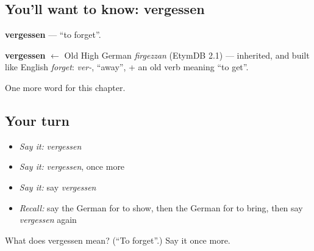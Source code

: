 \subsection*{You'll want to know: vergessen}
\textbf{vergessen} — \textquotedblleft{}to forget\textquotedblright{}.

\begin{cousinweb}
\textbf{vergessen} $\leftarrow$ Old High German \emph{firgezzan} (EtymDB 2.1) — inherited, and built like English \emph{forget}: \emph{ver-}, \textquotedblleft{}away\textquotedblright{}, + an old verb meaning \textquotedblleft{}to get\textquotedblright{}.
\end{cousinweb}

\begin{grammarlens}[title={What you've built}]
One more word for this chapter.
\end{grammarlens}

\subsection*{Your turn}
\begin{itemize}
\raggedright
  \item \emph{Say it:} \emph{vergessen}
  \item \emph{Say it:} \emph{vergessen}, once more
  \item \emph{Say it:} say \emph{vergessen}
  \item \emph{Recall:} say the German for to show, then the German for to bring, then say \emph{vergessen} again
\end{itemize}

\begin{tcolorbox}[breakable,colback=teal!4,colframe=teal!35!black,title={Before you move on}]
What does vergessen mean? (\textquotedblleft{}To forget\textquotedblright{}.) Say it once more.
\end{tcolorbox}
